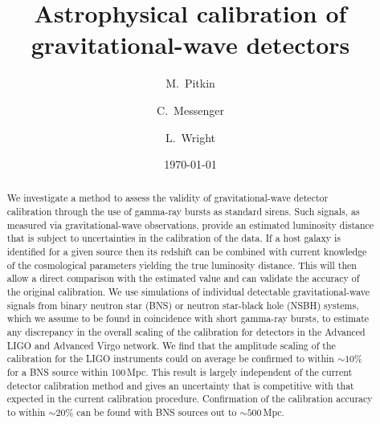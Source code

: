 \documentclass[prd, twocolumn, lengthcheck, superscriptaddress, showpacs, letterpaper, nofootinbib]{revtex4-1}
\newcommand{\dcc}{LIGO-P1500198}
\begin{document}
\title{Astrophysical calibration of gravitational-wave detectors}

\author{M.~Pitkin}
\author{C.~Messenger}
\author{L.~Wright}
  
\date{\today}

\begin{abstract}
  We investigate a method to assess the validity of gravitational-wave detector calibration 
through the use of gamma-ray bursts as standard
  sirens. Such signals, as measured via gravitational-wave
  observations, provide an estimated luminosity distance that is
  subject to uncertainties in the calibration of the data.  If a host
  galaxy is identified for a given source then its redshift can be
  combined with current knowledge of the cosmological
  parameters yielding the true luminosity distance.  This will then allow
  a direct comparison with the estimated value and can validate the accuracy of the original 
calibration. We use simulations of individual detectable gravitational-wave signals from binary 
neutron star (BNS) or neutron star-black hole (NSBH) systems, which we assume to be found in 
coincidence with short gamma-ray bursts, to estimate any discrepancy in the overall scaling of the 
calibration for detectors in the Advanced LIGO and Advanced Virgo network. We find that the 
amplitude scaling of the calibration for the LIGO instruments could on average be confirmed to 
within $\sim 10\%$ for a BNS source within 100\,Mpc. This result is largely independent of the 
current detector calibration method and gives an uncertainty that is competitive with that expected 
in the current calibration procedure. Confirmation of the calibration accuracy to within 
$\sim 20\%$ can be found with BNS sources out to $\sim 500$\,Mpc.
\end{abstract}

\preprint{\dcc}

\maketitle
\end{document}
